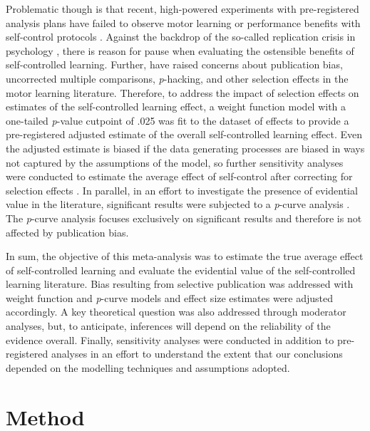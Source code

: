 \documentclass[man,floatsintext,hidelinks]{apa7}
\begin{document}
Problematic though is that recent, high-powered experiments with pre-registered analysis plans have failed to observe motor learning or performance benefits with self-control protocols \parencite{Grand2017-de,McKay2020-vj,Yantha2019-dt,StGermain2020-naspspa}. Against the backdrop of the so-called replication crisis in psychology \parencite{Open_Science_Collaboration2015-ay}, there is reason for pause when evaluating the ostensible benefits of self-controlled learning. Further, \Textcite{Lohse2016-cf} have raised concerns about publication bias, uncorrected multiple comparisons, \emph{p}-hacking, and other selection effects in the motor learning literature. Therefore, to address the impact of selection effects on estimates of the self-controlled learning effect, a weight function model \parencite{Carter2019-vv,Hedges1996-yh,Vevea1995-uv,Vevea2005-pv,McShane2016-by} with a one-tailed \emph{p}-value cutpoint of .025 was fit to the dataset of effects to provide a pre-registered adjusted estimate of the overall self-controlled learning effect. Even the adjusted estimate is biased if the data generating processes are biased in ways not captured by the assumptions of the model, so further sensitivity analyses were conducted to estimate the average effect of self-control after correcting for selection effects \parencite{Carter2019-vv,Vevea2005-pv}. In parallel, in an effort to investigate the presence of evidential value in the literature, significant results were subjected to a \emph{p}-curve analysis \parencite{Simonsohn2014-yo,Simonsohn2015-mn}. The \emph{p}-curve analysis focuses exclusively on significant results and therefore is not affected by publication bias.

In sum, the objective of this meta-analysis was to estimate the true average effect of self-controlled learning and evaluate the evidential value of the self-controlled learning literature. Bias resulting from selective publication was addressed with weight function and \emph{p}-curve models and effect size estimates were adjusted accordingly. A key theoretical question was also addressed through moderator analyses, but, to anticipate, inferences will depend on the reliability of the evidence overall. Finally, sensitivity analyses were conducted in addition to pre-registered analyses in an effort to understand the extent that our conclusions depended on the modelling techniques and assumptions adopted.

\section{Method}
\end{document}

